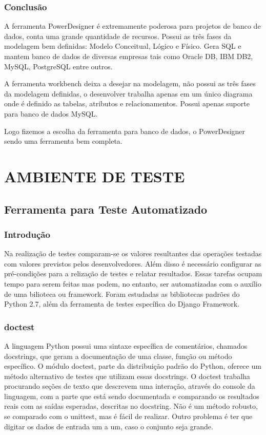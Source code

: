 \documentclass[12pt,a4paper]{article}
\begin{document}
		\subsubsection{Conclusão}
		
			A ferramenta PowerDesigner é extremamente poderosa para projetos de banco de dados, conta uma grande quantidade de
			recursos. Possui as três fases da modelagem bem definidas: Modelo Conceitual, Lógico e Físico. Gera SQL e mantem
			banco de dados de diversas empresas tais como Oracle DB, IBM DB2, MySQL, PostgreSQL entre outros.
			 
			A ferramenta workbench deixa a desejar na modelagem, não possui as três fases da modelagem definidas, o desenvolver
			trabalha apenas em um único diagrama onde é definido as tabelas, atributos e relacionamentos. Possui apenas suporte
			para banco de dados MySQL.
			
			Logo fizemos a escolha da ferramenta para banco de dados, o PowerDesigner sendo uma ferramenta bem completa.
		
\clearpage
\section{AMBIENTE DE TESTE}

	\subsection{Ferramenta para Teste Automatizado}
	
		\subsubsection{Introdução}
		
			Na realização de testes comparam-se os valores resultantes das
			operações testadas com valores previstos pelos desenvolvedores.
			Além disso é necessário configurar as pré-condições para a
			relização de testes e relatar resultados. Essas tarefas ocupam 
			tempo para serem feitas mas podem, no entanto, ser automatizadas
			com o auxílio de uma bilioteca ou framework.
			Foram estudadas as bibliotecas padrões do Python 2.7, além da
			ferramenta de testes específica do Django Framework.
			
		\subsubsection{doctest}
		
			A linguagem Python possui uma sintaxe específica de comentários, chamados docstrings,
			que geram a documentação de uma classe, função ou método específico.
			O módulo doctest, parte da distribuição padrão do Python, oferece um
			método alternativo de testes que utilizam essas docstrings.
			O doctest trabalha procurando seções de texto
			que descrevem uma interação, através do console da linguagem, com a parte que está
			sendo documentada e comparando os resultados reais
			com as saídas esperadas, descritas no docstring.
			Não é um método robusto, se comparado com o unittest, mas é fácil de realizar. Outro
			problema é ter que digitar os dados de entrada um a um, caso o conjunto seja grande.
			
\end{document}
